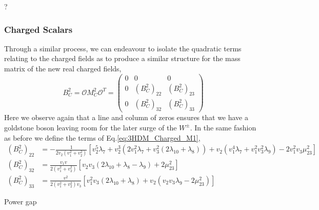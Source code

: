 { \color{red} ?}

\subsubsection{Charged Scalars}

Through a similar process, we can endeavour to isolate the quadratic terms relating to the charged fields as to produce a similar structure for the mass matrix of the new real charged fields, 
%
%
\begin{equation}
\label{eq:3HDM_Charged_M1}
B^2_C = \mathcal{O} M_C^2 \mathcal{O}^T = \left( \begin{array}{ccc}
0 & 0 & 0 \\ 
0 & \left( B^2_C \right)_{22} &  \left( B^2_C \right)_{23} \\
0 & \left( B^2_C \right)_{32} &  \left( B^2_C \right)_{33}
\end{array} \right) 
\end{equation}
%
Here we observe again that a line and column of zeros ensures that we have a goldstone boson leaving room for the later surge of the $W^\pm$. In the same fashion as before we define the terms of Eq.\ref{eq:3HDM_Charged_M1}, 
%
%
\begin{equation}
\begin{split}
\left( B^2_C \right)_{22} & = - \frac{1}{2v_2 (v_1^2 + v_2^2 ) } \left[ v_2^5 \lambda_7 + v_2^3 \left( 2 v_1^2 \lambda_7 + v_3^2 \left( 2\lambda_{10} + \lambda_8 \right) \right)  + v_2 \left( v_1^4 \lambda_7 + v_1^2 v_3^2 \lambda_9 \right) - 2 v_1^2 v_3 \mu_{23}^2 \right]   \\ 
%
\left( B^2_C \right)_{32} & = \frac{v_1 v}{ 2 ( v_1^2 + v_2^2 ) } \left[ v_2 v_3 \left( 2\lambda_{10} + \lambda_8 - \lambda_9 \right) + 2\mu_{23}^2 \right]   \\
\left( B^2_C \right)_{33} & = \frac{v^2}{2(v_1^2 +v^2_2)v_3 }
\left[ v_1^2 v_3 \left( 2 \lambda_{10} + \lambda_8 \right) + v_2 \left( v_2 v_3 \lambda_9 - 2 \mu_{23}^2 \right) \right]   
\end{split} 
\end{equation}

{ \color{red} Power gap }


